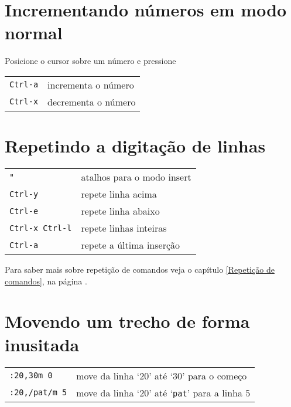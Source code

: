 \section{Incrementando números em modo normal}\label{Incrementando números em modo normal}

Posicione o cursor sobre um número e pressione
\begin{table}[htb]\begin{center} \begin{tabular}{ll} \hline
	 \verb|Ctrl-a| & incrementa o número\\
	 \verb|Ctrl-x| & decrementa o número\\
\hline \end{tabular}\end{center}\end{table}

\section{Repetindo a digitação de linhas}
\label{Repetindo a digitação de linhas}

\begin{table}[htb]\begin{center} \begin{tabular}{ll} \hline
     \verb|"| & atalhos para o modo insert\\
     \verb|Ctrl-y| & repete linha acima\\
     \verb|Ctrl-e| & repete linha abaixo\\
     \verb|Ctrl-x Ctrl-l| & repete linhas inteiras\\
     \verb|Ctrl-a| & repete a última inserção\\
\hline \end{tabular}\end{center}\end{table}

{\Large {}} Para saber mais sobre repetição de comandos veja o capítulo
\ref{Repetição de comandos}, na página \pageref{Repetição de comandos}.

\section{Movendo um trecho de forma inusitada}
\label{Movendo um trecho de forma inusitada}

\begin{table}[htb]\begin{center} \begin{tabular}{ll} \hline
     \verb|:20,30m 0| & move da linha `20' até `30' para o começo\\
     \verb|:20,/pat/m 5| & move da linha `20' até `\verb|pat|' para a linha 5\\
\hline \end{tabular}\end{center}\end{table}

